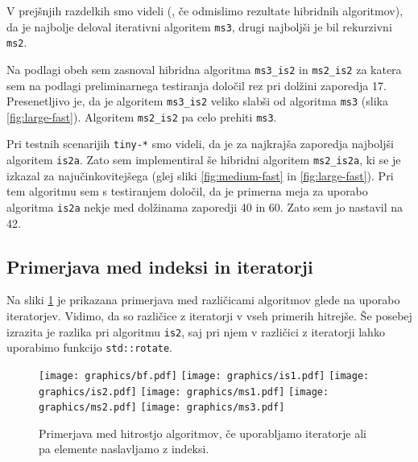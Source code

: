 \documentclass[11pt,a4paper]{article}
\theoremstyle{plain}
\theoremstyle{definition}
\begin{document}
V prejšnjih razdelkih smo videli (, če odmislimo rezultate hibridnih algoritmov), da je najbolje deloval iterativni algoritem \lstinline!ms3!, drugi najboljši je bil rekurzivni \lstinline!ms2!.

Na podlagi obeh sem zasnoval hibridna algoritma \lstinline!ms3_is2! in \lstinline!ms2_is2! za katera sem na podlagi preliminarnega testiranja določil rez pri dolžini zaporedja 17. Presenetljivo je, da je algoritem \lstinline!ms3_is2! veliko slabši od algoritma \lstinline!ms3! (slika \ref{fig:large-fast}). Algoritem \lstinline!ms2_is2! pa celo prehiti \lstinline!ms3!.

Pri testnih scenarijih \lstinline!tiny-*! smo videli, da je za najkrajša zaporedja najboljši algoritem \lstinline!is2a!. Zato sem implementiral še hibridni algoritem \lstinline!ms2_is2a!, ki se je izkazal za najučinkovitejšega (glej sliki \ref{fig:medium-fast} in \ref{fig:large-fast}). Pri tem algoritmu sem s testiranjem določil, da je primerna meja za uporabo algoritma \lstinline!is2a! nekje med dolžinama zaporedji 40 in 60. Zato sem jo nastavil na 42.

\subsection{Primerjava med indeksi in iteratorji}

Na sliki \ref{fig:idx} je prikazana primerjava med različicami algoritmov glede na uporabo iteratorjev. Vidimo, da so različice z iteratorji v vseh primerih hitrejše. Še posebej izrazita je razlika pri algoritmu \lstinline!is2!, saj pri njem v različici z iteratorji lahko uporabimo funkcijo \lstinline!std::rotate!.

\begin{figure}
\texttt{[image: graphics/bf.pdf]}%
\texttt{[image: graphics/is1.pdf]}
\texttt{[image: graphics/is2.pdf]}%
\texttt{[image: graphics/ms1.pdf]}
\texttt{[image: graphics/ms2.pdf]}%
\texttt{[image: graphics/ms3.pdf]}
\caption{Primerjava med hitrostjo algoritmov, če uporabljamo iteratorje ali pa elemente naslavljamo z indeksi.}
\label{fig:idx}
\end{figure}
\end{document}
